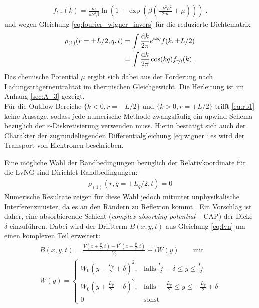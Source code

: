 \begin{align}
  f_{l,r} (k) = \frac{m}{\pi\hbar^2\beta} \ln(1+\exp(\beta(\frac{- k^2\hbar^2}{2m} + \mu))) \; .
  \label{eq:rb2}
\end{align}
und wegen Gleichung \eqref{eq:fourier_wigner_invers} für die reduzierte Dichtematrix
\begin{equation}
  \begin{aligned}
    \rho_{(1)}(r=\pm L/2, q, t) &= \int \frac{\mathop{}\!\mathrm{d} k}{2\pi} e^{ikq} f(k,\pm L/2) \\
                                &= \int \frac{\mathop{}\!\mathrm{d} k}{2\pi} \cos(kq) f_{\nicefrac{r}{l}} (k) \; .
  \end{aligned}
\end{equation}
Das chemische Potential $\mu$ ergibt sich dabei aus der Forderung nach Ladungsträgerneutralität im thermischen Gleichgewicht. Die Herleitung ist im Anhang \ref{sec:A_3} gezeigt.\\
Für die Outflow-Bereiche $\{ k<0, r=-L/2 \}$ und $\{ k>0, r=+L/2 \}$ trifft \eqref{eq:rb1} keine Aussage, sodass jede numerische Methode zwangsläufig ein upwind-Schema bezüglich der $r$-Diskretisierung verwenden muss. Hierin bestätigt sich auch der Charakter der zugrundeliegenden Differentialgleichung \eqref{eq:wigner}: es wird der Transport von Elektronen beschrieben.

Eine mögliche Wahl der Randbedingungen bezüglich der Relativkoordinate für die LvNG sind Dirichlet-Randbedingungen:
\begin{equation}
  \begin{aligned}
    \rho_{(1)}(r, q=\pm L_q/2, t) = 0
  \end{aligned}
  \label{eq:rb3}
\end{equation}
Numerische Resultate zeigen für diese Wahl jedoch mitunter unphysikalische Interferenzmuster, da es an den Rändern zu Reflexion kommt \cite{lukas1}. Ein Vorschlag ist daher, eine absorbierende Schicht (\emph{complex absorbing potential} -- CAP) der Dicke $\delta$ einzuführen. Dabei wird der Driftterm $B(x,y,t)$ aus Gleichung \eqref{eq:lvn} um einen komplexen Teil erweitert:
\begin{equation}
  \begin{aligned}
    B(x,y,t) = \frac{V\left(x+\frac{y}{2},t\right) - V^*\left(x-\frac{y}{2},t\right)}{V_0} + iW(y) \qquad \text{mit} \\
  W(y)=
  \begin{cases}
  W_0 \left(y-\frac{L_y}{2}+\delta \right)^2, & \text{falls}~\frac{L_y}{2}-\delta \le y \le \frac{L_y}{2}\\
  W_0 \left(y+\frac{L_y}{2}-\delta \right)^2, & \text{falls}~-\frac{L_y}{2} \le y \le -\frac{L_y}{2}+\delta\\
  0 & \text{sonst}
  \end{cases}
  \end{aligned}
  \label{eq:cap}
\end{equation}

